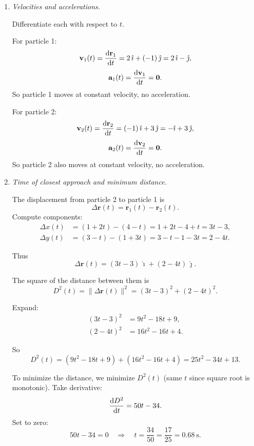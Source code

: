\documentclass[../main.tex]{subfiles}
\begin{document}
\begin{enumerate}
\begin{enumerate}
    \item \textit{Velocities and accelerations.}

    Differentiate each with respect to $t$.

    For particle 1:
    \[
    \mathbf{v}_1(t)
    = \dv{\mathbf{r}_1}{t}
    = 2\,\hat{\imath} + (-1)\,\hat{\jmath}
    = 2\,\hat{\imath} - \hat{\jmath},
    \]
    \[
    \mathbf{a}_1(t)
    = \dv{\mathbf{v}_1}{t}
    = \mathbf{0}.
    \]
    So particle 1 moves at constant velocity, no acceleration.

    For particle 2:
    \[
    \mathbf{v}_2(t)
    = \dv{\mathbf{r}_2}{t}
    = (-1)\,\hat{\imath} + 3\,\hat{\jmath}
    = -\hat{\imath} + 3\,\hat{\jmath},
    \]
    \[
    \mathbf{a}_2(t)
    = \dv{\mathbf{v}_2}{t}
    = \mathbf{0}.
    \]
    So particle 2 also moves at constant velocity, no acceleration.

    \item \textit{Time of closest approach and minimum distance.}

    The displacement from particle 2 to particle 1 is
    \[
    \Delta \mathbf{r}(t)
    = \mathbf{r}_1(t) - \mathbf{r}_2(t).
    \]
    Compute components:
    \begin{align*}
    \Delta x(t)
    &= (1+2t) - (4-t)
    = 1+2t-4+t
    = 3t - 3,
    \\
    \Delta y(t)
    &= (3-t) - (1+3t)
    = 3-t-1-3t
    = 2 - 4t.
    \end{align*}

    Thus
    \[
    \Delta \mathbf{r}(t)
    = (3t-3)\,\hat{\imath} + (2-4t)\,\hat{\jmath}.
    \]

    The square of the distance between them is
    \[
    D^2(t)
    = \|\Delta \mathbf{r}(t)\|^2
    = (3t-3)^2 + (2-4t)^2.
    \]

    Expand:
    \begin{align*}
    (3t-3)^2 &= 9t^2 -18t +9, \\
    (2-4t)^2 &= 16t^2 -16t +4.
    \end{align*}

    So
    \[
    D^2(t)
    = (9t^2 -18t +9) + (16t^2 -16t +4)
    = 25t^2 -34t +13.
    \]

    To minimize the distance, we minimize $D^2(t)$ (same $t$ since square root is monotonic). Take derivative:
    \[
    \dv{D^2}{t} = 50t - 34.
    \]
    Set to zero:
    \[
    50t - 34 = 0
    \quad\Rightarrow\quad
    t = \frac{34}{50} = \frac{17}{25} = 0.68~\text{s}.
    \]


\end{enumerate}
\end{enumerate}
\end{document}
